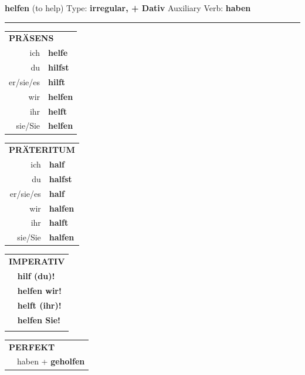 \documentclass[10pt,a4paper]{revtex4-2}
\begin{document}
\begin{verbbox-dat}
    {\Large \bf helfen} (to help) \hfill Type: \textbf{irregular, + Dativ} \hfill Auxiliary Verb: \textbf{haben} 
    
     \vspace{5pt}

    \hrule
    
    \vspace{5pt}

  \begin{tabular}{rl}
     \multicolumn{2}{l}{\textbf{PRÄSENS} }\\
    ich & \textbf{helfe}\\
    du & \textbf{hilfst}\\
    er/sie/es & \textbf{hilft}\\
    wir & \textbf{helfen}\\
    ihr & \textbf{helft}\\
    sie/Sie & \textbf{helfen}\\
  \end{tabular}
  \hfill
     \begin{tabular}{rl}
    \multicolumn{2}{l}{\textbf{PRÄTERITUM} }\\
    ich & \textbf{half}\\
    du & \textbf{halfst}\\
    er/sie/es & \textbf{half}\\
    wir & \textbf{halfen}\\
    ihr & \textbf{halft}\\
    sie/Sie & \textbf{halfen}\\
  \end{tabular}
  \hfill
  \begin{tabular}{rl}
     \multicolumn{2}{l}{\textbf{IMPERATIV} }\\
   & \textbf{hilf (du)!}\\
   & \textbf{helfen wir!}\\
   & \textbf{helft (ihr)!}\\
   & \textbf{helfen Sie!}\\
   & \vspace{10pt}
  \end{tabular}

    \vspace{10pt}

 \begin{tabular}{rl}
     \multicolumn{2}{l}{\textbf{PERFEKT}}\\
  &  haben + \textbf{geholfen}\\
  \end{tabular}
\hfill
   \begin{tabular}{rl}
   

\end{tabular}
\end{verbbox-dat}
\end{document}
